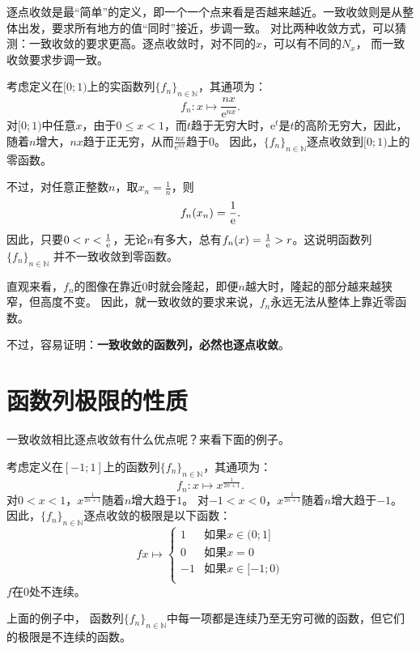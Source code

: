 \documentclass[12pt,UTF8]{ctexbook}
\begin{document}
逐点收敛是最“简单”的定义，即一个一个点来看是否越来越近。一致收敛则是从整体出发，要求所有地方的值“同时”接近，步调一致。
对比两种收敛方式，可以猜测：一致收敛的要求更高。逐点收敛时，对不同的$x$，可以有不同的$N_x$，
而一致收敛要求步调一致。

\begin{ex}
    考虑定义在$[0;1)$上的实函数列$\{f_n\}_{n\in\mathbb{N}}$，其通项为：
    $$ f_n: x \mapsto \frac{nx}{\mathrm{e}^{nx}}. $$
    对$[0;1)$中任意$x$，由于$0\leqslant x<1$，而$t$趋于无穷大时，$\mathrm{e}^t$是$t$的高阶无穷大，因此，随着$n$增大，$nx$趋于正无穷，从而$\frac{nx}{\mathrm{e}^{nx}}$趋于$0$。
    因此，$\{f_n\}_{n\in\mathbb{N}}$逐点收敛到$[0;1)$上的零函数。

    不过，对任意正整数$n$，取$x_n = \frac{1}{n}$，则
    $$f_n(x_n) = \frac{1}{\mathrm{e}}.$$
    因此，只要$0<r <\frac{1}{\mathrm{e}}$，无论$n$有多大，总有$f_n(x) = \frac{1}{\mathrm{e}} > r$。这说明函数列$\{f_n\}_{n\in\mathbb{N}}$
    并不一致收敛到零函数。
    
    直观来看，$f_n$的图像在靠近$0$时就会隆起，即便$n$越大时，隆起的部分越来越狭窄，但高度不变。
    因此，就一致收敛的要求来说，$f_n$永远无法从整体上靠近零函数。

\end{ex}

不过，容易证明：\textbf{一致收敛的函数列，必然也逐点收敛}。

\section{函数列极限的性质}

一致收敛相比逐点收敛有什么优点呢？来看下面的例子。

\begin{ex}
    考虑定义在$[-1;1]$上的函数列$\{f_n\}_{n\in\mathbb{N}}$，其通项为：
    $$ f_n: x \mapsto x^{\frac{1}{2n+1}}. $$
    对$0<x<1$，$x^{\frac{1}{2n+1}}$随着$n$增大趋于$1$。
    对$-1<x<0$，$x^{\frac{1}{2n+1}}$随着$n$增大趋于$-1$。
    因此，$\{f_n\}_{n\in\mathbb{N}}$逐点收敛的极限是以下函数：
    $$
    f x\mapsto \left\{
        \begin{array}{ll}
            1 & \mbox{如果} x \in (0; 1] \\
            0 & \mbox{如果} x = 0 \\
            -1 & \mbox{如果} x \in [-1; 0) \\
        \end{array}
    \right.
    $$
    $f$在$0$处不连续。
\end{ex}
上面的例子中，
函数列$\{f_n\}_{n\in\mathbb{N}}$中每一项都是连续乃至无穷可微的函数，但它们的极限是不连续的函数。
\end{document}
